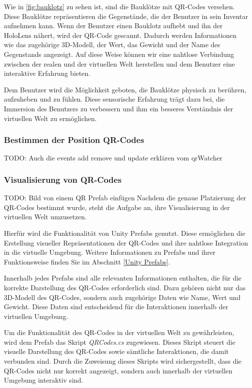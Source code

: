 Wie in \ref{fig:bauklotz} zu sehen ist, sind die Bauklötze mit QR-Codes versehen. Diese Bauklötze repräsentieren die Gegenstände,
die der Benutzer in sein Inventar aufnehmen kann. Wenn der Benutzer einen Bauklotz aufhebt und ihn der HoloLens nähert, wird
der QR-Code gescannt. Dadurch werden Informationen wie das zugehörige 3D-Modell, der Wert, das Gewicht und der Name des
Gegenstands angezeigt. Auf diese Weise können wir eine nahtlose Verbindung zwischen der realen und der virtuellen Welt
herstellen und dem Benutzer eine interaktive Erfahrung bieten.

Dem Benutzer wird die Möglichkeit geboten, die Bauklötze physisch zu berühren, aufzuheben und zu fühlen. Diese sensorische
Erfahrung trägt dazu bei, die Immersion des Benutzers zu verbessern und ihm ein besseres Verständnis der virtuellen Welt
zu ermöglichen.

\subsubsection{Bestimmen der Position QR-Codes}
TODO: Auch die events add remove und update erklären vom qrWatcher

\subsubsection{Visualisierung von QR-Codes}
TODO: Bild von einem QR Prefab einfügen
Nachdem die genaue Platzierung der QR-Codes bestimmt wurde, steht die Aufgabe an, ihre Visualisierung in der virtuellen Welt umzusetzen.

Hierfür wird die Funktionalität von Unity Prefabs genutzt. Diese ermöglichen die Erstellung visueller Repräsentationen
der QR-Codes und ihre nahtlose Integration in die virtuelle Umgebung. Weitere Informationen zu Prefabs und ihrer Funktionsweise
finden Sie im Abschnitt \ref{Unity Prefabs}.

Innerhalb jedes Prefabs sind alle relevanten Informationen enthalten, die für die korrekte Darstellung des QR-Codes
erforderlich sind. Dazu gehören nicht nur das 3D-Modell des QR-Codes, sondern auch zugehörige Daten wie Name, Wert und
Gewicht. Diese Daten sind entscheidend für die Interaktionen innerhalb der virtuellen Umgebung.

Um die Funktionalität des QR-Codes in der virtuellen Welt zu gewährleisten, wird dem Prefab das Skript \textit{QRCodes.cs} zugewiesen.
Dieses Skript steuert die visuelle Darstellung des QR-Codes sowie sämtliche Interaktionen, die damit verbunden sind. Durch
die Zuweisung dieses Skripts wird sichergestellt, dass die QR-Codes nicht nur korrekt angezeigt, sondern auch innerhalb
der virtuellen Umgebung interaktiv sind.


